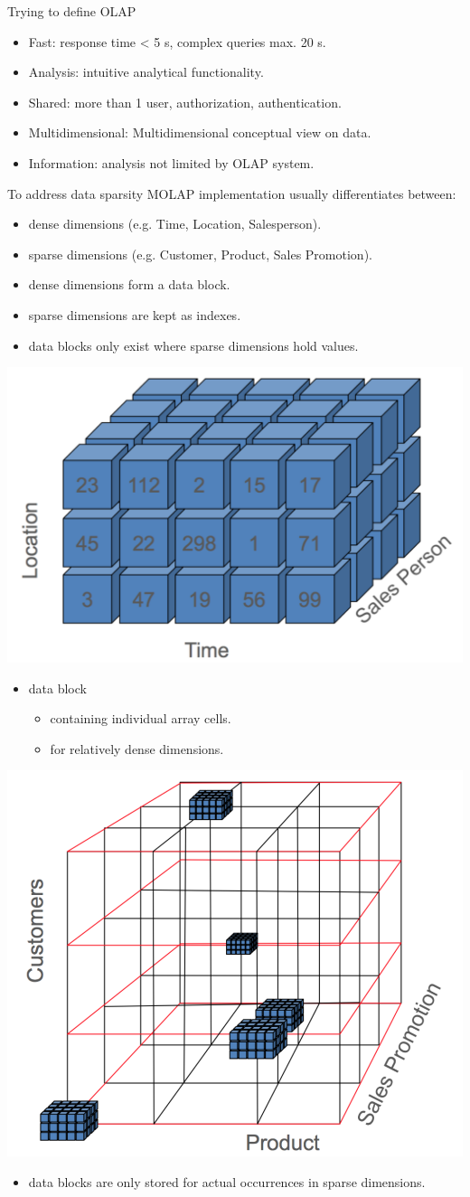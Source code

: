 \begin{breakbox}
Trying to define OLAP
\begin{itemize}
	\item \textcolor{Emerald}{F}ast: response time < 5 s, complex queries max. 20 s.
	\item \textcolor{Emerald}{A}nalysis: intuitive analytical functionality.
	\item \textcolor{Emerald}{S}hared: more than 1 user, authorization, authentication.
	\item \textcolor {Emerald}{M}ultidimensional: Multidimensional conceptual view on data.
	\item \textcolor{Emerald}{I}nformation: analysis not limited by OLAP system.
\end{itemize}
\end{breakbox}
\begin{breakbox}
\newline To address data sparsity MOLAP implementation usually differentiates between:
\begin{itemize}
	\item dense dimensions (e.g. Time, Location, Salesperson).
	\item sparse dimensions (e.g. Customer, Product, Sales Promotion).
	\item dense dimensions form a data block.
	\item sparse dimensions are kept as indexes.
	\item data blocks only exist where sparse dimensions hold values.
\end{itemize}
\begin{center}
\includegraphics[width=.05\textwidth]{slides_images/dense_molap}
\end{center}
\begin{itemize}
	\item data block
	\begin{itemize}
		\item containing individual array cells.
		\item for relatively dense dimensions.
	\end{itemize}
\end{itemize}
\begin{center}
\includegraphics[width=.05\textwidth]{slides_images/sparse_molap}
\end{center}
\begin{itemize}
	\item data blocks are only stored for actual occurrences in sparse dimensions.
\end{itemize}
\end{breakbox}


